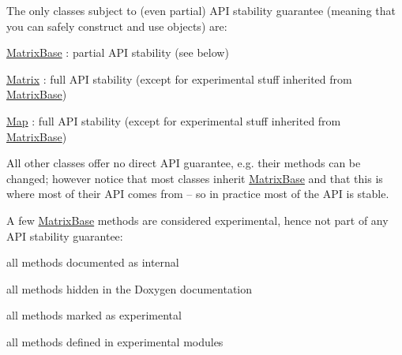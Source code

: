 The only classes subject to (even partial) A\+PI stability guarantee (meaning that you can safely construct and use objects) are\+: \begin{DoxyItemize}
\item \hyperlink{group___core___module_class_eigen_1_1_matrix_base}{Matrix\+Base} \+: partial A\+PI stability (see below) \item \hyperlink{group___core___module_class_eigen_1_1_matrix}{Matrix} \+: full A\+PI stability (except for experimental stuff inherited from \hyperlink{group___core___module_class_eigen_1_1_matrix_base}{Matrix\+Base}) \item \hyperlink{group___core___module_class_eigen_1_1_map}{Map} \+: full A\+PI stability (except for experimental stuff inherited from \hyperlink{group___core___module_class_eigen_1_1_matrix_base}{Matrix\+Base})\end{DoxyItemize}
All other classes offer no direct A\+PI guarantee, e.\+g. their methods can be changed; however notice that most classes inherit \hyperlink{group___core___module_class_eigen_1_1_matrix_base}{Matrix\+Base} and that this is where most of their A\+PI comes from -- so in practice most of the A\+PI is stable.

A few \hyperlink{group___core___module_class_eigen_1_1_matrix_base}{Matrix\+Base} methods are considered experimental, hence not part of any A\+PI stability guarantee\+: \begin{DoxyItemize}
\item all methods documented as internal \item all methods hidden in the Doxygen documentation \item all methods marked as experimental \item all methods defined in experimental modules \end{DoxyItemize}
